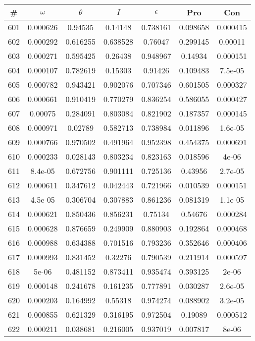 \newpage
\begin{table}
\begin{tabular}{c|c|c|c|c|c|c}
\# & $\omega$ & $\theta$ & $I$ & $\epsilon$ & Pro & Con\\
\hline
601 & 0.000626 & 0.94535 & 0.14148 & 0.738161 & 0.098658 & 0.000415\\
602 & 0.000292 & 0.616255 & 0.638528 & 0.76047 & 0.299145 & 0.00011\\
603 & 0.000271 & 0.595425 & 0.26438 & 0.948967 & 0.14934 & 0.000151\\
604 & 0.000107 & 0.782619 & 0.15303 & 0.91426 & 0.109483 & 7.5e-05\\
605 & 0.000782 & 0.943421 & 0.902076 & 0.707346 & 0.601505 & 0.000327\\
606 & 0.000661 & 0.910419 & 0.770279 & 0.836254 & 0.586055 & 0.000427\\
607 & 0.00075 & 0.284091 & 0.803084 & 0.821902 & 0.187357 & 0.000145\\
608 & 0.000971 & 0.02789 & 0.582713 & 0.738984 & 0.011896 & 1.6e-05\\
609 & 0.000766 & 0.970502 & 0.491964 & 0.952398 & 0.454375 & 0.000691\\
610 & 0.000233 & 0.028143 & 0.803234 & 0.823163 & 0.018596 & 4e-06\\
611 & 8.4e-05 & 0.672756 & 0.901111 & 0.725136 & 0.43956 & 2.7e-05\\
612 & 0.000611 & 0.347612 & 0.042443 & 0.721966 & 0.010539 & 0.000151\\
613 & 4.5e-05 & 0.306704 & 0.307883 & 0.861236 & 0.081319 & 1.1e-05\\
614 & 0.000621 & 0.850436 & 0.856231 & 0.75134 & 0.54676 & 0.000284\\
615 & 0.000628 & 0.876659 & 0.249909 & 0.880903 & 0.192864 & 0.000468\\
616 & 0.000988 & 0.634388 & 0.701516 & 0.793236 & 0.352646 & 0.000406\\
617 & 0.000993 & 0.831452 & 0.32276 & 0.790539 & 0.211914 & 0.000597\\
618 & 5e-06 & 0.481152 & 0.873411 & 0.935474 & 0.393125 & 2e-06\\
619 & 0.000148 & 0.241678 & 0.161235 & 0.777891 & 0.030287 & 2.6e-05\\
620 & 0.000203 & 0.164992 & 0.55318 & 0.974274 & 0.088902 & 3.2e-05\\
621 & 0.000855 & 0.621329 & 0.316195 & 0.972504 & 0.19089 & 0.000512\\
622 & 0.000211 & 0.038681 & 0.216005 & 0.937019 & 0.007817 & 8e-06\\

\end{tabular}
\end{table}
